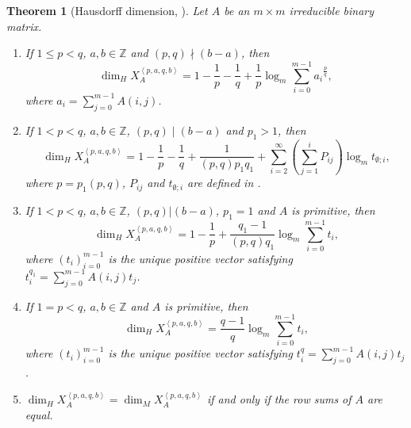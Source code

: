 \documentclass{amsart}
\newtheorem{theorem}{Theorem}[section]
\theoremstyle{definition}
\numberwithin{equation}{section}%
\begin{document}
\begin{theorem}[Hausdorff dimension, \cite{ban2024hausdorffaffine}]
\label{Thm: 3}Let $A$ be an $m\times m$ irreducible
binary matrix. 
\begin{enumerate}
\item If $1\leq p<q$, $a, b\in \mathbb{Z}$ and $(p,q)\nmid (b-a)$, then 
\[
\dim _{H}X_{A}^{\left\langle p,a,q,b\right\rangle }=1-\frac{1}{p}-\frac{1}{q}+\frac{1}{p}\log _{m}\sum_{i=0}^{m-1}a_{i}{}^{\frac{p}{q}}, 
\]
where $a_i=\sum_{j=0}^{m-1}A(i,j)$.

\item If $1<p<q$, $a, b\in \mathbb{Z}$, $(p,q)\mid (b-a)$ and $p_{1}>1$, then 
\[
\dim _{H}X_{A}^{\left\langle p,a,q,b\right\rangle }=1-\frac{1}{p}-\frac{1}{q}+\frac{1}{(p,q)p_{1}q_{1}}+\sum_{i=2}^{\infty }\left(
\sum_{j=1}^{i}P_{ij}\right) \log _{m}t_{\emptyset ;i}\text{,} 
\]
where $p=p_{1}(p,q)$, $P_{ij}$ and $t_{\emptyset ;i}$ are defined in \cite[(3.4) and (3.5)]{ban2024hausdorffaffine}. 

\item If $1<p<q$, $a,b\in \mathbb{Z}$, $(p,q)|(b-a)$, $p_{1}=1$ and $A$ is primitive, then 
\[
\dim _{H}X_{A}^{\left\langle p,a,q,b\right\rangle }=1-\frac{1}{p}+\frac{q_{1}-1}{(p,q)q_{1}}\log_{m}\sum_{i=0}^{m-1}t_{i}\text{,} 
\]
where $\left( t_{i}\right) _{i=0}^{m-1}$ is the unique positive vector
satisfying $t_{i}^{q_1}=\sum_{j=0}^{m-1}A(i,j)t_{j}$.

\item If $1=p<q$, $a,b\in \mathbb{Z}$ and $A$ is primitive, then 
\begin{equation}
\dim _{H}X_{A}^{\left\langle p,a,q,b\right\rangle }=\frac{q-1}{q}\log_{m}\sum_{i=0}^{m-1}t_{i}\text{,}
\end{equation}
where $(t_{i})_{i=0}^{m-1}$ is the unique positive vector satisfying $t_{i}^{q}=\sum_{j=0}^{m-1}A(i,j)t_{j}$.

\item $\dim _{H}X_{A}^{\left\langle p,a,q,b\right\rangle }=\dim
_{M}X_{A}^{\left\langle p,a,q,b\right\rangle }$ if and only if the row sums of $A$ are equal.
\end{enumerate}
\end{theorem}
\end{document}
